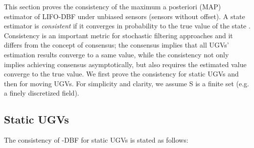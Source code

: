 	
	This section proves the consistency of the maximum a posteriori (MAP) estimator of LIFO-DBF under unbiased sensors (sensors without offset).
	A state estimator is \textit{consistent} if it converges in probability to the true value of the state \cite{amemiya1985advanced}.
	Consistency is an important metric for stochastic filtering approaches \cite{chen2003bayesian} and it differs from the concept of consensus; the consensus implies that all UGVs' estimation results converge to a same value, while the consistency not only implies achieving consensus asymptotically, but also requires the estimated value converge to the true value.	
	We first prove the consistency for static UGVs and then for moving UGVs. 
	For simplicity and clarity, we assume S is a finite set (e.g. a finely discretized field).
	
	\subsection{Static UGVs}	
	The consistency of \proto-DBF for static UGVs is stated as follows: 
	
